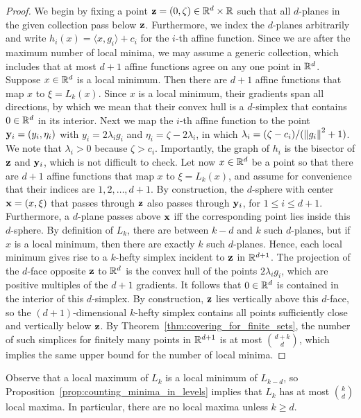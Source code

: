 \documentclass[10pt,a4paper]{article}
\newcommand {\mm}[1] {\ifmmode{#1}\else{\mbox{\(#1\)}}\fi}
\newcommand {\scalprod}[2] {{\langle #1 , #2 \rangle}}
\theoremstyle{plain}
\newcommand{\Rspace}        {\mm{{\mathbb R}}}
\newcommand{\xxx}           {\mm{\bf{x}}}
\newcommand{\yyy}           {\mm{\bf{y}}}
\newcommand{\zzz}           {\mm{\bf{z}}}
\newcommand{\norm}[1]       {\mm{\|{#1}\|}}
\begin{document}
\begin{proof}
  We begin by fixing a point $\zzz = (0, \zeta) \in \Rspace^d \times \Rspace$ such that all $d$-planes in the given collection pass below $\zzz$.
  Furthermore, we index the $d$-planes arbitrarily and write $h_i(x) = \scalprod{x}{g_i} + c_i$
  for the $i$-th affine function.
  Since we are after the maximum number of local minima, we may assume a generic collection, which includes that at most $d+1$ affine functions agree on any one point in $\Rspace^d$.
  \smallskip
  Suppose $x \in \Rspace^d$ is a local minimum.
  Then there are $d+1$ affine functions that map $x$ to $\xi = L_k(x)$.
  Since $x$ is a local minimum, their gradients span all directions, by which we mean that their convex hull is a $d$-simplex that contains $0 \in \Rspace^d$ in its interior.
  Next we map the $i$-th affine function to the point $\yyy_i = (y_i, \eta_i)$ with $y_i = 2 \lambda_i g_i$ and $\eta_i = \zeta - 2 \lambda_i$, in which $\lambda_i = ({\zeta - c_i}) / ({\norm{g_i}^2 + 1})$.
  We note that $\lambda_i > 0$ because $\zeta > c_i$.
  Importantly, the graph of $h_i$ is the bisector of $\zzz$ and $\yyy_i$, which is not difficult to check.
  \smallskip
  Let now $x \in \Rspace^d$ be a point so that there are $d+1$ affine functions that map $x$ to $\xi = L_k(x)$, and assume for convenience that their indices are $1, 2, \ldots, d+1$.
  By construction, the $d$-sphere with center $\xxx = (x, \xi)$ that passes through $\zzz$ also passes through $\yyy_i$, for $1 \leq i \leq d+1$.
  Furthermore, a $d$-plane passes above $\xxx$ iff the corresponding point lies inside this $d$-sphere.
  By definition of $L_k$, there are between $k-d$ and $k$ such $d$-planes, but if $x$ is a local minimum, then there are exactly $k$ such $d$-planes.
  Hence, each local minimum gives rise to a $k$-hefty simplex incident to $\zzz$ in $\Rspace^{d+1}$.
  The projection of the $d$-face opposite $\zzz$ to $\Rspace^d$ is the convex hull of the points $2 \lambda_i g_i$, which are positive multiples of the $d+1$ gradients.
  It follows that $0 \in \Rspace^d$ is contained in the interior of this $d$-simplex.
  By construction, $\zzz$ lies vertically above this $d$-face, so the $(d+1)$-dimensional $k$-hefty simplex contains all points sufficiently close and vertically below $\zzz$.
  By Theorem~\ref{thm:covering_for_finite_sets}, the number of such simplices for finitely many points in $\Rspace^{d+1}$ is at most $\binom{d+k}{d}$, which implies the same upper bound for the number of local minima.
\end{proof}
Observe that a local maximum of $L_k$ is a local minimum of $L_{k-d}$, so Proposition~\ref{prop:counting_minima_in_levels} implies that $L_k$ has at most $\binom{k}{d}$ local maxima.
In particular, there are no local maxima unless $k \geq d$.
\end{document}
